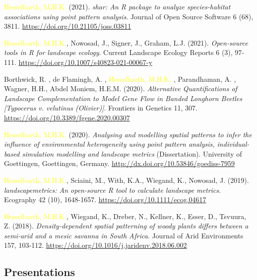 \documentclass[hidelinks]{report}
\begin{document}
\begin{hangparas}{7.5mm}{1}
\textcolor{yellow}{Hesselbarth, M.H.K.} (2021). \textit{shar: An R package to analyze species-habitat associations using point pattern analysis}. Journal of Open Source Software 6 (68), 3811. \url{https://doi.org/10.21105/joss.03811}

\textcolor{yellow}{Hesselbarth, M.H.K.}, Nowosad, J., Signer, J., Graham, L.J. (2021). \textit{Open-source tools in R for landscape ecology}. Current Landscape Ecology Reports 6 (3), 97-111. \url{https://doi.org/10.1007/s40823-021-00067-y}

Borthwick, R. \textcolor{green}{\Cross}, de Flamingh, A. \textcolor{green}{\Cross}, \textcolor{yellow}{Hesselbarth, M.H.K.} \textcolor{green}{\Cross}, Parandhaman, A. \textcolor{green}{\Cross}, Wagner, H.H., Abdel Moniem, H.E.M. (2020). \textit{Alternative Quantifications of Landscape Complementation to Model Gene Flow in Banded Longhorn Beetles [Typocerus v. velutinus (Olivier)]}. Frontiers in Genetics 11, 307. \url{https://doi.org/10.3389/fgene.2020.00307}

\textcolor{yellow}{Hesselbarth, M.H.K.} (2020). \textit{Analysing and modelling spatial patterns to infer the influence of environmental heterogeneity using point pattern analysis, individual-based simulation modelling and landscape metrics} (Dissertation). University of Goettingen, Goettingen, Germany. \url{http://dx.doi.org/10.53846/goediss-7959}

\textcolor{yellow}{Hesselbarth, M.H.K.}, Sciaini, M., With, K.A., Wiegand, K., Nowosad, J. (2019). \textit{landscapemetrics: An open-source R tool to calculate landscape metrics}. Ecography 42 (10), 1648-1657. \url{https://doi.org/10.1111/ecog.04617}

\textcolor{yellow}{Hesselbarth, M.H.K.}, Wiegand, K., Dreber, N., Kellner, K., Esser, D., Tsvuura, Z. (2018). \textit{Density-dependent spatial patterning of woody plants differs between a semi-arid and a mesic savanna in South Africa}. Journal of Arid Environments 157, 103-112. \url{https://doi.org/10.1016/j.jaridenv.2018.06.002}

\end{hangparas}

\subsection*{Presentations}
\end{document}
